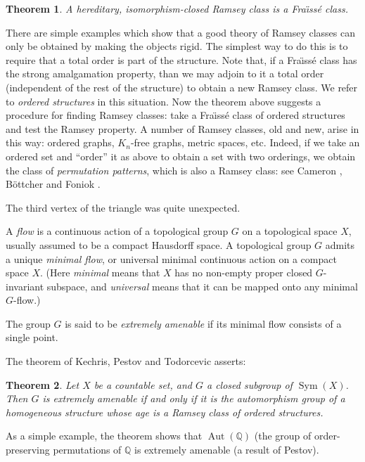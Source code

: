 \documentclass{book}
\newtheorem{theorem}{Theorem}
\DeclareMathOperator{\Sym}{Sym}
\DeclareMathOperator{\Aut}{Aut}
\begin{document}
\begin{theorem}
A hereditary, isomorphism-closed Ramsey class is a Fra\"{\i}ss\'e class.
\end{theorem}

There are simple examples which show that a good theory of Ramsey classes
can only be obtained by making the objects rigid. The simplest way to do this
is to require that a total order is part of the structure. Note that, if a
Fra\"{\i}ss\'e class has the strong amalgamation property, than we may adjoin
to it a total order (independent of the rest of the structure) to obtain a
new Ramsey class. We refer to \emph{ordered structures} in this situation.
Now the theorem above suggests a procedure for finding Ramsey classes: take
a Fra\"{\i}ss\'e class of ordered structures and test the Ramsey property.
A number of Ramsey classes, old and new, arise in this way: ordered graphs,
$K_n$-free graphs, metric spaces, etc. Indeed, if we take an ordered set
and ``order'' it as above to obtain a set with two orderings, we obtain
the class of \emph{permutation patterns}, which is also a Ramsey class:
see Cameron \cite{ch32:new2}, B\"ottcher and Foniok \cite{ch32:new4}.

The third vertex of the triangle was quite unexpected. 

A \emph{flow} is a continuous action of a topological group $G$ on a 
topological space $X$, usually assumed to be a compact Hausdorff space.
A topological group $G$ admits a unique \emph{minimal flow}, or universal
minimal continuous action on a compact space $X$. (Here \emph{minimal} means
that $X$ has no non-empty proper closed $G$-invariant subspace, and
\emph{universal} means that it can be mapped onto any minimal $G$-flow.)

The group $G$ is said to be \emph{extremely amenable} if its minimal flow
consists of a single point.

The theorem of Kechris, Pestov and Todorcevic \cite{ch32:new10} asserts:

\begin{theorem}
Let $X$ be a countable set, and $G$ a closed subgroup of $\Sym(X)$. Then
$G$ is extremely amenable if and only if it is the automorphism group of
a homogeneous structure whose age is a Ramsey class of ordered structures.
\end{theorem}

As a simple example, the theorem shows that $\Aut(\mathbb{Q})$ (the group
of order-preserving permutations of $\mathbb{Q}$ is extremely amenable
(a result of Pestov).
\end{document}
